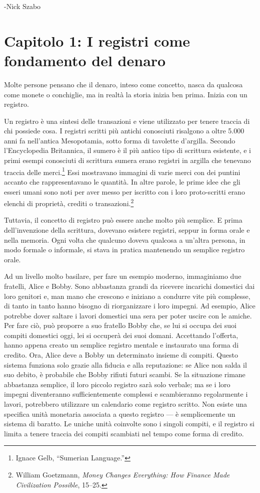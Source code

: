 \documentclass[
  a5paper,
  smalldemyvopaper,10pt,twoside,onecolumn,openright,extrafontsizes,hidelinks]{memoir}
\begin{document}
-Nick Szabo


\chapter{Capitolo 1: I registri come fondamento del
denaro}\label{capitolo-1-i-registri-come-fondamento-del-denaro}

Molte persone pensano che il denaro, inteso come concetto, nasca da
qualcosa come monete o conchiglie, ma in realtà la storia inizia ben
prima. Inizia con un registro.

Un registro è una sintesi delle transazioni e viene utilizzato per
tenere traccia di chi possiede cosa. I registri scritti più antichi
conosciuti risalgono a oltre 5.000 anni fa nell'antica Mesopotamia,
sotto forma di tavolette d'argilla. Secondo l'Encyclopedia Britannica,
il sumero è il più antico tipo di scrittura esistente, e i primi esempi
conosciuti di scrittura sumera erano registri in argilla che tenevano
traccia delle merci.\footnote{Ignace Gelb, ``Sumerian Language.''} Essi
mostravano immagini di varie merci con dei puntini accanto che
rappresentavano le quantità. In altre parole, le prime idee che gli
esseri umani sono noti per aver messo per iscritto con i loro
proto-scritti erano elenchi di proprietà, crediti o
transazioni.\footnote{William Goetzmann, \emph{Money Changes Everything:
  How Finance Made Civilization Possible}, 15--25.}

Tuttavia, il concetto di registro può essere anche molto più semplice. E
prima dell'invenzione della scrittura, dovevano esistere registri,
seppur in forma orale e nella memoria. Ogni volta che qualcuno doveva
qualcosa a un'altra persona, in modo formale o informale, si stava in
pratica mantenendo un semplice registro orale.

Ad un livello molto basilare, per fare un esempio moderno, immaginiamo
due fratelli, Alice e Bobby. Sono abbastanza grandi da ricevere
incarichi domestici dai loro genitori e, man mano che crescono e
iniziano a condurre vite più complesse, di tanto in tanto hanno bisogno
di riorganizzare i loro impegni. Ad esempio, Alice potrebbe dover
saltare i lavori domestici una sera per poter uscire con le amiche. Per
fare ciò, può proporre a suo fratello Bobby che, se lui si occupa dei
suoi compiti domestici oggi, lei si occuperà dei suoi domani. Accettando
l'offerta, hanno appena creato un semplice registro mentale e instaurato
una forma di credito. Ora, Alice deve a Bobby un determinato insieme di
compiti. Questo sistema funziona solo grazie alla fiducia e alla
reputazione: se Alice non salda il suo debito, è probabile che Bobby
rifiuti futuri scambi. Se la situazione rimane abbastanza semplice, il
loro piccolo registro sarà solo verbale; ma se i loro impegni
diventeranno sufficientemente complessi e scambieranno regolarmente i
lavori, potrebbero utilizzare un calendario come registro scritto. Non
esiste una specifica unità monetaria associata a questo registro --- è
semplicemente un sistema di baratto. Le uniche unità coinvolte sono i
singoli compiti, e il registro si limita a tenere traccia dei compiti
scambiati nel tempo come forma di credito.
\end{document}
